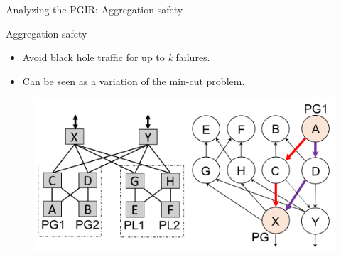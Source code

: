 \begin{frame}{Analyzing the PGIR: Aggregation-safety}
    \begin{block}{Aggregation-safety}
        \begin{itemize}
            \item Avoid black hole traffic for up to \textit{k} failures.
            \item Can be seen as a variation of the min-cut problem.
        \end{itemize}
    \end{block}
    \begin{figure}[t!]
        \includegraphics[width=0.5\columnwidth]{figures/aggregation}
        \vspace{-1em}
    \end{figure}
\end{frame}

